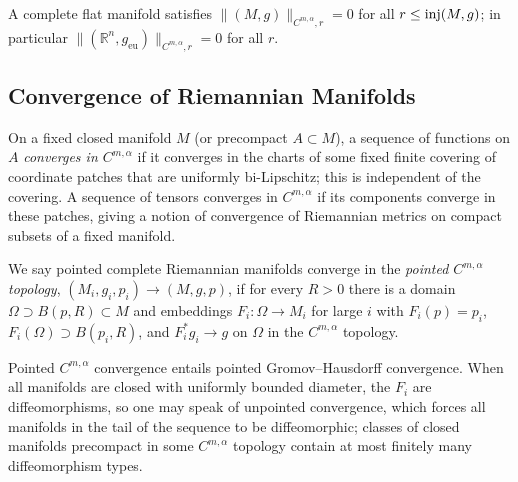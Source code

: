 \begin{example}
  \label{ex:pet-ch11-flat-manifold-norm-zero}

  A complete flat manifold satisfies $\|(M,g)\|_{C^{m,\alpha},r}=0$
  for all $r\le\operatorname{inj}(M,g)$; in particular
  $\|(\mathbb{R}^n,g_{\mathrm{eu}})\|_{C^{m,\alpha},r}=0$ for all $r$.
\end{example}

\subsection{Convergence of Riemannian Manifolds}

\begin{definition}
  \label{def:pet-ch11-tensor-convergence-compact-subset}

  On a fixed closed manifold $M$ (or precompact $A\subset M$), a sequence
  of functions on $A$ \emph{converges in $C^{m,\alpha}$} if it converges in
  the charts of some fixed finite covering of coordinate patches that are
  uniformly bi-Lipschitz; this is independent of the covering. A sequence of
  tensors converges in $C^{m,\alpha}$ if its components converge in these
  patches, giving a notion of convergence of Riemannian metrics on compact
  subsets of a fixed manifold.
\end{definition}

\begin{definition}
  \label{def:pet-ch11-pointed-cmalpha-convergence}

  We say pointed complete Riemannian manifolds converge in the
  \emph{pointed $C^{m,\alpha}$ topology}, $(M_i,g_i,p_i)\to(M,g,p)$, if for
  every $R>0$ there is a domain $\Omega\supset B(p,R)\subset M$ and
  embeddings $F_i:\Omega\to M_i$ for large $i$ with $F_i(p)=p_i$,
  $F_i(\Omega)\supset B(p_i,R)$, and $F_i^*g_i\to g$ on $\Omega$ in the
  $C^{m,\alpha}$ topology.
\end{definition}

\begin{remark}
  \label{rem:pet-ch11-cmalpha-convergence-implies-gh}

  Pointed $C^{m,\alpha}$ convergence entails pointed Gromov--Hausdorff
  convergence. When all manifolds are closed with uniformly bounded
  diameter, the $F_i$ are diffeomorphisms, so one may speak of unpointed
  convergence, which forces all manifolds in the tail of the sequence to be
  diffeomorphic; classes of closed manifolds precompact in some $C^{m,\alpha}$
  topology contain at most finitely many diffeomorphism types.
\end{remark}

